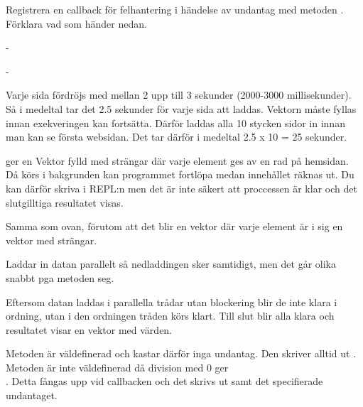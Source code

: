 \Subtask Registrera en callback för felhantering i händelse av undantag med metoden . Förklara vad som händer nedan.



\SOLUTION


\TaskSolved \what

\SubtaskSolved  -

\SubtaskSolved  -

\SubtaskSolved  Varje sida fördröjs med mellan 2 upp till 3 sekunder (2000-3000 millisekunder). Så i medeltal tar det 2.5 sekunder för varje sida att laddas. Vektorn måste fyllas innan exekveringen kan fortsätta. Därför laddas alla 10 stycken sidor in innan man kan se första websidan. Det tar därför i medeltal 2.5 x 10 = 25 sekunder.

\SubtaskSolved  {} ger en Vektor fylld med strängar där varje element ges av en rad på hemsidan. Då  körs i bakgrunden kan programmet fortlöpa medan innehållet räknas ut. Du kan därför skriva  i REPL:n men det är inte säkert att proccessen är klar och det slutgilltiga resultatet visas.

\SubtaskSolved  Samma som ovan, förutom att det blir en vektor där varje element är i sig en vektor med strängar.

\SubtaskSolved  Laddar in datan parallelt så nedladdingen sker samtidigt, men det går olika snabbt pga metoden seg.

\SubtaskSolved  Eftersom datan laddas i parallella trådar utan blockering blir de inte klara i ordning, utan i den ordningen tråden körs klart. Till slut blir alla klara och resultatet visar en vektor med  värden.

\SubtaskSolved  Metoden  är väldefinerad och kastar därför inga undantag. Den skriver alltid ut \code{:)}. Metoden  är inte väldefinerad då division med 0 ger \\. Detta fångas upp vid callbacken och det skrivs ut \code{:(} samt det specifierade undantaget.

\ExtraTasks %


